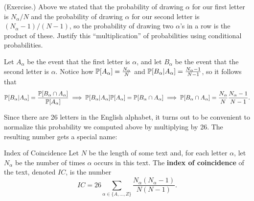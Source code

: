 \documentclass[letterpaper]{article}
\begin{document}
\begin{mdframed}
    (Exercise.) Above we stated that the probability of drawing $\alpha$ for our first letter is $N_\alpha / N$ and the probability of drawing $\alpha$ for our second letter is $(N_\alpha - 1) / (N - 1)$, so the probability of drawing two $\alpha$'s in a row is the product of these. Justify this ``multiplication'' of probabilities using conditional probabilities.

    \begin{mdframed}
        Let $A_{\alpha}$ be the event that the first letter is $\alpha$, and let $B_\alpha$ be the event that the second letter is $\alpha$. Notice how $\mathbb{P}[A_{\alpha}] = \frac{N_\alpha}{N}$ and $\mathbb{P}[B_\alpha | A_\alpha] = \frac{N_\alpha - 1}{N - 1}$, so it follows that \[\mathbb{P}[B_\alpha | A_\alpha] = \frac{\mathbb{P}[B_\alpha \cap A_\alpha]}{\mathbb{P}[A_\alpha]} \implies \mathbb{P}[B_\alpha | A_\alpha] \mathbb{P}[A_\alpha] = \mathbb{P}[B_\alpha \cap A_\alpha] \implies \mathbb{P}[B_\alpha \cap A_\alpha] = \frac{N_\alpha}{N} \frac{N_\alpha - 1}{N - 1}.\]
    \end{mdframed}
\end{mdframed}
Since there are 26 letters in the English alphabet, it turns out to be convenient to normalize this probability we computed above by multiplying by 26. The resulting number gets a special name: 
\begin{definition}{Index of Coincidence}{}
    Let $N$ be the length of some text and, for each letter $\alpha$, let $N_\alpha$ be the number of times $\alpha$ occurs in this text. The \textbf{index of coincidence} of the text, denoted $IC$, is the number \[IC = 26 \sum_{\alpha \in \{A, \hdots, Z\}} \frac{N_\alpha (N_\alpha - 1)}{N(N - 1)}.\]
\end{definition}
\end{document}
